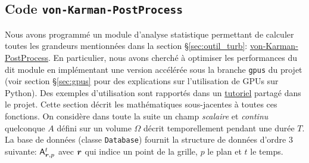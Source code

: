 \documentclass[13pt, a4paper]{extarticle}
\begin{document}
\subsection{Code \texttt{von-Karman-PostProcess}}\label{sec:code-VK}
\noindent Nous avons programmé un module d'analyse statistique permettant de calculer toutes
les grandeurs mentionnées dans la section \S\ref{sec:outil_turb}:
\href{https://gitlab.lisn.upsaclay.fr/allaglo/von-karman-postprocess}
{von-Karman-PostProcess}. En particulier, nous avons cherché à optimiser les performances
du dit module en implémentant une version accélérée sous la branche \texttt{gpus}
du projet (voir section \S \ref{sec:gpus} pour des explications sur l'utilisation de 
GPUs sur Python). Des exemples d'utilisation sont rapportés
dans un \href{https://gitlab.lisn.upsaclay.fr/allaglo/von-karman-postprocess/-/blob/main/tutorial/tutorial.ipynb}{tutoriel}
partagé dans le projet. Cette section décrit les mathématiques sous-jacentes à
toutes ces fonctions. On considère dans toute la suite un champ \emph{scalaire} et 
\emph{continu} quelconque $A$ défini sur un volume $\Omega$ décrit temporellement pendant une durée $T$.
La base de données (classe \texttt{Database}) fournit la structure de données
d'ordre 3 suivante:
$\mathsf{A}_{\boldsymbol{r},p}^t$ avec $\boldsymbol{r}$ qui indice un point de la grille, $p$ le plan
et $t$ le temps.
\end{document}

